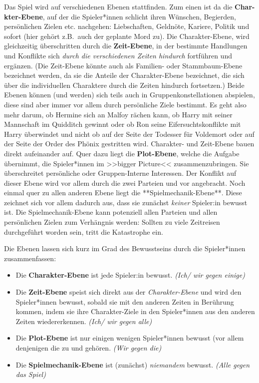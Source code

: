 Das Spiel wird auf verschiedenen Ebenen stattfinden.  
Zum einen ist da die \textbf{Char-kter-Ebene}, auf der die Spieler*innen schlicht ihren 
Wünschen, Begierden, persönlichen Zielen etc. nachgehen: Liebschaften, Geldnöte, 
Kariere, Politik und sofort (hier gehört z.B.~auch der geplante Mord zu).  
Die Charakter-Ebene, wird gleichzeitig überschritten durch die \textbf{Zeit-Ebene},
in der bestimmte Handlungen und Konflikte sich \emph{durch die verschiedenen Zeiten
hindurch} fortführen und ergänzen. (Die Zeit-Ebene könnte auch als Familien- oder
Stammbaum-Ebene bezeichnet werden, da sie die Anteile der Charakter-Ebene
bezeichnet, die sich über die individuellen Charaktere durch die Zeiten hindurch
fortsetzen.) Beide Ebenen können (und werden) sich teils auch in
Gruppenkonstellationen abspielen, diese sind aber immer vor allem durch
persönliche Ziele bestimmt. Es geht also mehr darum, ob Hermine sich an Malfoy
rächen kann, ob Harry mit seiner Mannschaft im Quidditch gewinnt oder ob Ron seine
Eifersuchtskonflikte mit Harry überwindet und nicht ob auf der Seite der
Todesser für Voldemort oder auf der Seite der Order des Phönix gestritten wird.  
Charakter- und Zeit-Ebene bauen direkt aufeinander auf. Quer dazu liegt die
\textbf{Plot-Ebene}, welche die Aufgabe übernimmt, die Spieler*innen im >>bigger
Picture<< zusammenzubringen. Sie überschreitet persönliche oder Gruppen-Interne
Interessen. Der Konflikt auf dieser Ebene wird vor allem durch die zwei Parteien 
 und  vor angebracht.   
Noch einmal quer zu allen anderen Ebene liegt die **Spielmechanik-Ebene**. Diese
zeichnet sich vor allem dadurch aus, dass sie zunächst \emph{keiner} Spieler:in
bewusst ist. Die Spielmechanik-Ebene kann potenziell allen Parteien und allen
persönlichen Zielen zum Verhängnis werden: Sollten zu viele Zeitreisen
durchgeführt worden sein, tritt die Katastrophe ein. 

Die Ebenen lassen sich kurz im Grad des Bewusstseins durch die Spieler*innen
zusammenfassen:

\begin{itemize}
  \item Die \textbf{Charakter-Ebene} ist jede Spieler:in bewusst. \emph{(Ich/
    wir gegen einige)}
  \item Die \textbf{Zeit-Ebene} speist sich direkt aus der \emph{Charakter-Ebene} und wird den
    Spieler*innen bewusst, sobald sie mit den anderen Zeiten in Berührung kommen,
    indem sie ihre Charakter-Ziele in den Spieler*innen aus den anderen Zeiten
    wiedererkennen. \emph{(Ich/ wir gegen alle)}
  \item Die \textbf{Plot-Ebene} ist nur einigen wenigen Spieler*innen bewusst (vor allem
    denjenigen die zu  und  gehören. \emph{(Wir
    gegen die)}
  \item Die \textbf{Spielmechanik-Ebene} ist (zunächst) \emph{niemandem}
    bewusst. \emph{(Alle gegen das Spiel)}
\end{itemize}

